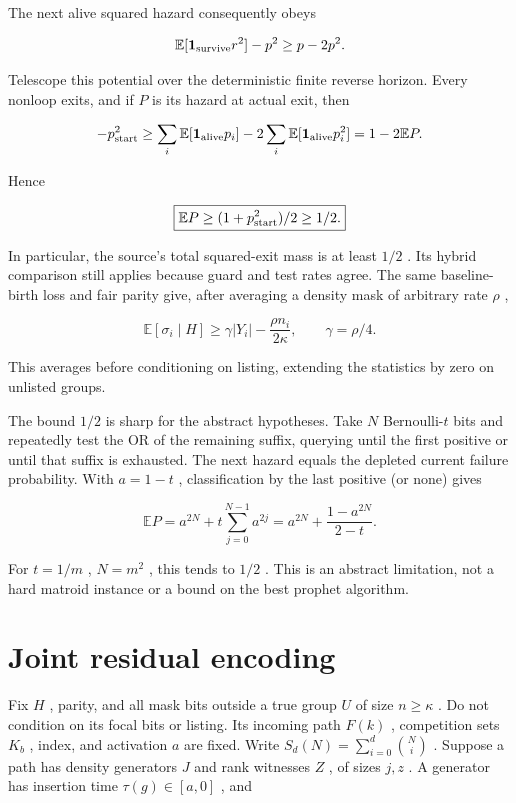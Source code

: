 \documentclass[11pt]{article}
\begin{document}
The next alive squared hazard consequently obeys

\[\mathbb{E}[\mathbf 1_{\rm survive}r^2]-p^2\ge p-2p^2.\]

Telescope this potential over the deterministic finite reverse horizon. Every nonloop exits, and if \(P\) is its hazard at actual exit, then

\[-p_{\rm start}^2\ge
 \sum_i\mathbb{E}[\mathbf 1_{\rm alive}p_i]-2\sum_i\mathbb{E}[\mathbf 1_{\rm alive}p_i^2]
 =1-2\mathbb{E}P.\]

Hence

\[\boxed{\mathbb{E}P\ge(1+p_{\rm start}^2)/2\ge1/2.}\]

In particular, the source's total squared-exit mass is at least \(1/2\) . Its hybrid comparison still applies because guard and test rates agree. The same baseline-birth loss and fair parity give, after averaging a density mask of arbitrary rate \(\rho\) ,

\[\mathbb{E}[\sigma_i\mid H]\ge \gamma|Y_i|-\frac{\rho n_i}{2\kappa},
 \qquad\gamma=\rho/4.\]

This averages before conditioning on listing, extending the statistics by zero on unlisted groups.

The bound \(1/2\) is sharp for the abstract hypotheses. Take \(N\) Bernoulli-\(t\) bits and repeatedly test the OR of the remaining suffix, querying until the first positive or until that suffix is exhausted. The next hazard equals the depleted current failure probability. With \(a=1-t\) , classification by the last positive (or none) gives

\[\mathbb{E}P=a^{2N}+t\sum_{j=0}^{N-1}a^{2j}
 =a^{2N}+\frac{1-a^{2N}}{2-t}.\]

For \(t=1/m\) , \(N=m^2\) , this tends to \(1/2\) . This is an abstract limitation, not a hard matroid instance or a bound on the best prophet algorithm.

\section{Joint residual encoding}\label{joint-residual-encoding}

Fix \(H\) , parity, and all mask bits outside a true group \(U\) of size \(n\ge\kappa\) . Do not condition on its focal bits or listing. Its incoming path \(F(k)\) , competition sets \(K_b\) , index, and activation \(a\) are fixed. Write \(S_d(N)=\sum_{i=0}^d\binom Ni\) . Suppose a path has density generators \(J\) and rank witnesses \(Z\) , of sizes \(j,z\) . A generator has insertion time \(\tau(g)\in[a,0]\) , and
\end{document}

